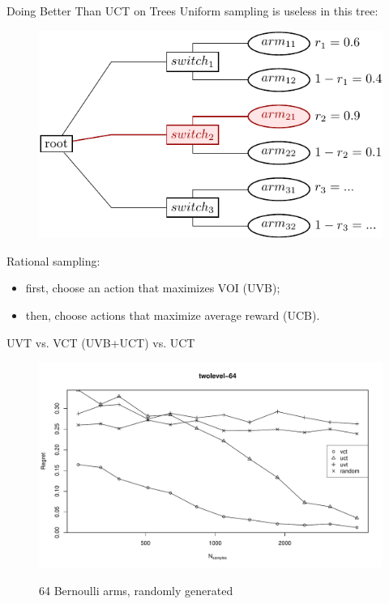 \documentclass{beamer}
\begin{document}
\begin{frame}{Doing Better Than UCT on Trees}
Uniform sampling is useless in this tree:
\begin{figure}[h]
\centering
\includegraphics[scale=0.8]{twolevel-tree.pdf}
\end{figure}
Rational sampling:
\begin{itemize}
\item first, choose an action that maximizes VOI (UVB);
\item then, choose actions that maximize average reward (UCB).
\end{itemize}
\end{frame}{}

\begin{frame}{UVT vs. VCT (UVB+UCT) vs. UCT}
\begin{figure}[h]
\centering
\includegraphics[scale=0.45]{twolevel-64.pdf}

64 Bernoulli arms, randomly generated
\end{figure}
\end{frame}
\end{document}

